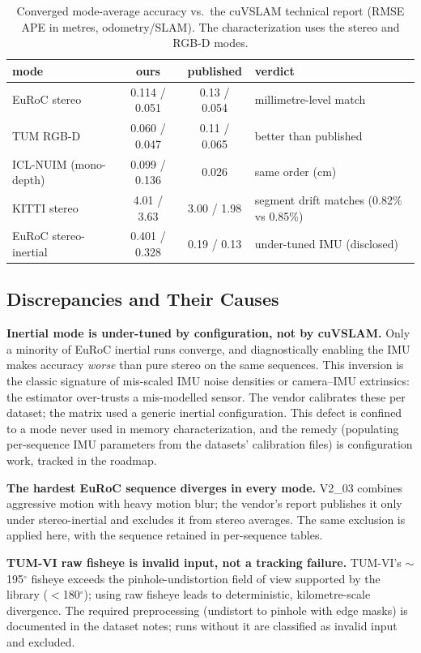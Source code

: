 \begin{table}[t]
\centering
\caption{Converged mode-average accuracy vs.\ the cuVSLAM technical report (RMSE APE in metres, odometry/SLAM). The characterization uses the stereo and RGB-D modes.}
\label{tab:accuracy}
\begin{tabular}{@{}lccl@{}}
\toprule
mode & ours & published & verdict \\
\midrule
EuRoC stereo & 0.114 / 0.051 & 0.13 / 0.054 & millimetre-level match \\
TUM RGB-D & 0.060 / 0.047 & 0.11 / 0.065 & better than published \\
ICL-NUIM (mono-depth) & 0.099 / 0.136 & 0.026 & same order (cm) \\
KITTI stereo & 4.01 / 3.63 & 3.00 / 1.98 & segment drift matches (0.82\% vs 0.85\%) \\
EuRoC stereo-inertial & 0.401 / 0.328 & 0.19 / 0.13 & under-tuned IMU (disclosed) \\
\bottomrule
\end{tabular}
\end{table}

\subsection{Discrepancies and Their Causes}
\label{sec:val-discrepancies}

\textbf{Inertial mode is under-tuned by configuration, not by cuVSLAM.} Only a minority of EuRoC inertial runs converge, and diagnostically enabling the IMU makes accuracy \emph{worse} than pure stereo on the same sequences. This inversion is the classic signature of mis-scaled IMU noise densities or camera--IMU extrinsics: the estimator over-trusts a mis-modelled sensor. The vendor calibrates these per dataset; the matrix used a generic inertial configuration. This defect is confined to a mode never used in memory characterization, and the remedy (populating per-sequence IMU parameters from the datasets' calibration files) is configuration work, tracked in the roadmap.

\textbf{The hardest EuRoC sequence diverges in every mode.} V2\_03 combines aggressive motion with heavy motion blur; the vendor's report publishes it only under stereo-inertial and excludes it from stereo averages. The same exclusion is applied here, with the sequence retained in per-sequence tables.

\textbf{TUM-VI raw fisheye is invalid input, not a tracking failure.} TUM-VI's $\sim$195$^\circ$ fisheye exceeds the pinhole-undistortion field of view supported by the library ($<$180$^\circ$); using raw fisheye leads to deterministic, kilometre-scale divergence. The required preprocessing (undistort to pinhole with edge masks) is documented in the dataset notes; runs without it are classified as invalid input and excluded.

